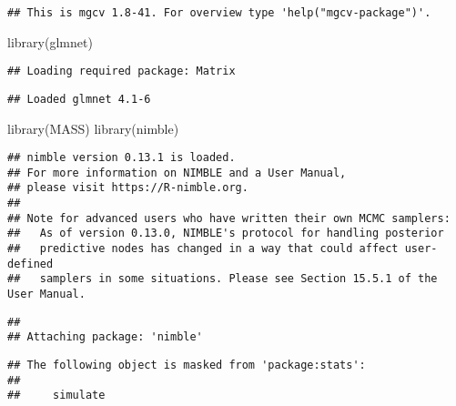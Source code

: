 \documentclass[
]{article}
\newenvironment{Shaded}{\begin{snugshade}}{\end{snugshade}}
\newcommand{\FunctionTok}[1]{\textcolor[rgb]{0.00,0.00,0.00}{#1}}
\newcommand{\NormalTok}[1]{#1}
\begin{document}
\begin{verbatim}
## This is mgcv 1.8-41. For overview type 'help("mgcv-package")'.
\end{verbatim}

\begin{Shaded}
\begin{Highlighting}[]
\FunctionTok{library}\NormalTok{(glmnet)}
\end{Highlighting}
\end{Shaded}

\begin{verbatim}
## Loading required package: Matrix
\end{verbatim}

\begin{verbatim}
## Loaded glmnet 4.1-6
\end{verbatim}

\begin{Shaded}
\begin{Highlighting}[]
\FunctionTok{library}\NormalTok{(MASS)}
\FunctionTok{library}\NormalTok{(nimble)}
\end{Highlighting}
\end{Shaded}

\begin{verbatim}
## nimble version 0.13.1 is loaded.
## For more information on NIMBLE and a User Manual,
## please visit https://R-nimble.org.
## 
## Note for advanced users who have written their own MCMC samplers:
##   As of version 0.13.0, NIMBLE's protocol for handling posterior
##   predictive nodes has changed in a way that could affect user-defined
##   samplers in some situations. Please see Section 15.5.1 of the User Manual.
\end{verbatim}

\begin{verbatim}
## 
## Attaching package: 'nimble'
\end{verbatim}

\begin{verbatim}
## The following object is masked from 'package:stats':
## 
##     simulate
\end{verbatim}
\end{document}
